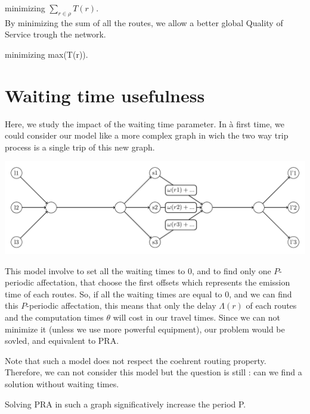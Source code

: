 \documentclass{article}
\begin{document}
 minimizing $\sum_{r \in \rho}  T(r)$.\\

By minimizing the sum of all the routes, we allow a better global Quality of Service trough the network.

 minimizing max(T(r)).\\



\section{Waiting time usefulness}

Here, we study the impact of the waiting time parameter. In à first time, we could consider our model like a more complex graph in wich the two way trip
process is a single trip of this new graph.

\begin{center}
 
\includegraphics[scale=0.7]{Fig9.pdf}\\

\end{center}

This model involve to set all the waiting times to 0, and to find only one $P$-periodic affectation, that choose the first offsets which represents the
emission time of each routes. So, if all the waiting times are equal to 0, and we can find this $P$-periodic affectation, this means that only the delay
$\Lambda(r)$ of each routes and the computation times $\theta$ will cost in our travel times. Since we can not minimize it (unless we use more powerful 
equipment), our problem would be sovled, and equivalent to PRA.

Note that such a model does not respect the coehrent routing property. Therefore, we can not consider this model but the question is still : can we
find a solution without waiting times.

\begin{lemma}
 Solving PRA in such a graph significatively increase the period P.
\end{lemma}
\end{document}
